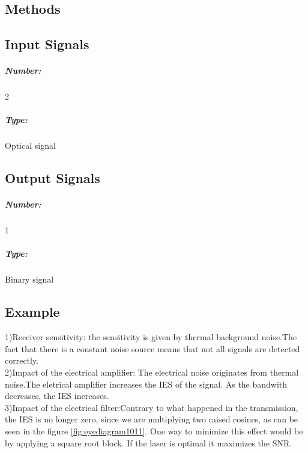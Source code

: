 \subsection*{Methods}

%

\subsection*{Input Signals}

\subparagraph*{Number:} 2

\subparagraph*{Type:} Optical signal

\subsection*{Output Signals}

\subparagraph*{Number:} 1

\subparagraph*{Type:} Binary signal

\subsection*{Example}
1)Receiver sensitivity: the sensitivity is given by thermal background noise.The fact that there is a constant noise source means that not all signals are detected correctly.\\ 2)Impact of the electrical amplifier: The electrical noise originates from thermal noise.The eletrical amplifier increases the IES of the signal. As the bandwith decreases, the IES increases.\\ 
3)Impact of the electrical filter:Contrary to what happened in the transmission, the IES is no longer zero, since we are multiplying two raised cosines, as can be seen in the figure \ref{fig:eyediagram1011}. One way to minimize this effect would be by applying a square root block. If the laser is optimal it maximizes the SNR.



